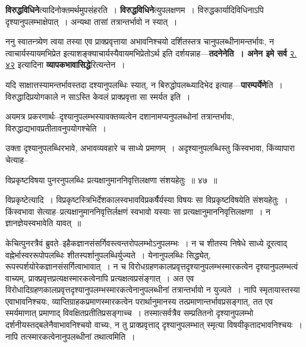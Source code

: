 \documentclass[article,12pt,a4paper]{memoir}
\begin{document}
	  \pstart \textbf{विरुद्धविधिने}त्यादिनोक्तमर्थमुपसंहरति । \textbf{विरुद्धविधिने}त्युपलक्षणम । विरुद्धकार्यादिविधिनाऽपि दृश्यानुपलम्भाक्षेपात् । अन्यथा तासां तत्रान्तर्भावो न स्यात् ।
	\pend
      

	  \pstart ननु स्वातन्त्र्येण त्वया तस्या एव प्राक्प्रवृत्ताया अभावनिश्चयो दर्शितस्तत्र चानुपलब्धीनामन्तर्भावः, न त्वाचार्यस्यायमभिप्रेत इत्याशङ्क्याचार्यस्यैवायमभिप्रेतोऽर्थ इति दर्शयन्नाह—\textbf{तदनेनेति । अनेन इमे सर्व} \href{http://sarit.indology.info/?cref=2.42}{२. ४२} इत्यादिना \textbf{व्यापकभावासिद्धे}रित्यन्तेन ।
	\pend
      

	  \pstart यदि साक्षात्तस्यामन्तर्भावस्तदा दश्यानुपलब्धिः स्यात्, न बिरुद्धोपलब्ध्यादिभेद इत्याह—\textbf{पारम्पर्येणे}ति । विरुद्धादिप्रयोगकाले न साऽस्ति केवलं प्राक्प्रवृत्ता सा स्मर्यत इति ।
	\pend
      

	  \pstart अयमत्र प्रकरणार्थः--दृश्यानुपलम्भस्यावक्तव्यत्वेन दशानामप्यनुपलब्धोनां तत्रान्तर्भावः, विरुद्धाद्यभावप्रतीतावनुपयोगश्चेति ।
	\pend
	  \bigskip
	  \begingroup
	

	  \pstart उक्ता दृश्यानुपलब्धिरभावे, अभावव्यवहारे च साध्ये प्रमाणम् । अदृश्यानुपलब्धिस्तु किंस्वभावा, किंव्यापारा चेत्याह--
	\pend
        
	  \bigskip
	  \begingroup
	

	  \pstart विप्रकृष्टविषया पुनरनुपलब्धिः प्रत्यक्षानुमाननिवृत्तिलक्षणा संशयहेतुः ॥ ४७ ॥
	\pend
      
	  \endgroup
	 

	  \pstart विप्रकृष्टेत्यादि । विप्रकृष्टस्त्रिभिर्देशकालस्वभावविप्रकर्षैर्यस्या विषयः सा विप्रकृष्टविषयेति संशयहेतुः । किंस्वभावा सेत्याह--प्रत्यक्षानुमाननिवृत्तिर्लक्षणं स्वभावो यस्याः सा प्रत्यक्षानुमाननिवृत्तिलक्षणा । न ज्ञानज्ञेयस्वभावेति यावत् ॥
	\pend
      
	  \endgroup
	

	  \pstart केचित्पुनरत्रैवं ब्रुवते--इहैकज्ञानसंसर्गिवस्त्वन्तरोपलम्भोऽनुपलम्भः । न च शीतस्य निषेधे साध्ये दूरत्वाद् वह्नेर्भास्वररूपोपलब्धिः शीतस्पर्शानुपलब्धिर्युज्यते । येनानुपलब्धिः सिद्ध्येत्, रूपस्पर्शयोरेकज्ञानसंसर्गित्वाभावात् । \leavevmode{} न च विरोधग्रहणकालप्रवृत्तदृश्यानुपलम्भस्मारकत्वेन दृश्यानुपलम्भत्वं वाच्यम्, प्राक्प्रवृत्तप्रत्यक्षस्मारकत्वेनापि प्रत्यक्षत्वप्रसंङ्गात् । अत एव विरोधादिग्रहणकालप्रवृत्तदृश्यानुपलम्भस्मारकत्वेनानुपलब्धीनां तत्रान्तर्भावो न युज्यते । नापि स्मृतायास्तस्या एवाभावनिश्चयः, व्याप्तिग्राहकप्रमाणस्मारकत्वेन परार्थानुमानस्य तत्प्रमाणान्तर्भावप्रसङ्गात्, तत एव स्मर्यमाणात् प्रमाणाद् विवक्षितप्रतीतिप्रसङ्गाच्च । तस्मात्सर्वत्रैव सम्प्रतितनो दृश्यानुपलम्भो दर्शनीयस्तद्बलेनैवाभावनिश्चयो वाच्यः, न तु प्राक्प्रवृत्ताद् दृश्यानुपलम्भात् स्मृत्या विषयीकृतादभावनिश्चयः । नापि तत्स्मारकत्वेनानुपलब्धीनां तथात्वमिति ।
	\pend
      
\end{document}
